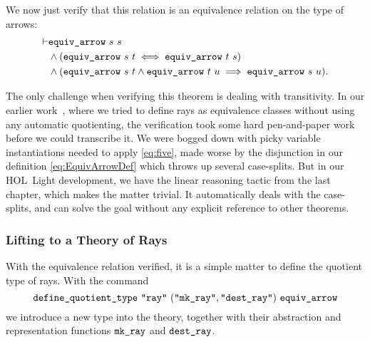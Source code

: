 We now just verify that this relation is an equivalence relation on the type of arrows:
\begin{equation*}
  \begin{split}
    \vdash&\code{equiv\_arrow}\ s\ s\\
    &\wedge (\code{equiv\_arrow}\ s\ t \iff \code{equiv\_arrow}\ t\ s)\\
    &\wedge (\code{equiv\_arrow}\ s\ t \wedge \code{equiv\_arrow}\ t\ u \implies\code{equiv\_arrow}\ s\ u).
  \end{split}
\end{equation*}

\label{sec:RayTransitivity}The only challenge when verifying this theorem is dealing with transitivity. In our earlier work~\cite{ScottMScThesis}, where we tried to define rays as equivalence classes without using any automatic quotienting, the verification took some hard pen-and-paper work before we could transcribe it. We were bogged down with picky variable instantiations needed to apply \ref{eq:five}, made worse by the disjunction in our definition \eqref{eq:EquivArrowDef} which throws up several case-splits. But in our HOL~Light development, we have the linear reasoning tactic from the last chapter, which makes the matter trivial. It automatically deals with the case-splits, and can solve the goal without any explicit reference to other theorems.


\subsubsection{Lifting to a Theory of Rays}
With the equivalence relation verified, it is a simple matter to define the quotient type of rays. With the command
\begin{displaymath}
  \code{define\_quotient\_type}\ \code{"ray"}\ (\code{"mk\_ray"},\code{"dest\_ray"})\ \code{equiv\_arrow}
\end{displaymath}
we introduce a new type  into the theory, together with their abstraction and representation functions $\texttt{mk\_ray}$ and $\texttt{dest\_ray}$. 


